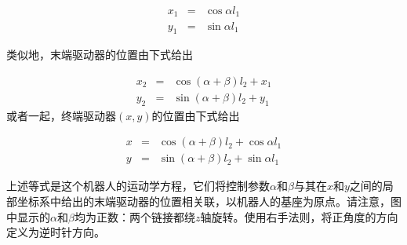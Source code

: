 \begin{eqnarray}\label{eq:cosxl1}
x_1 &=&\cos \alpha l_1\\
y_1 &=&\sin \alpha l_1
\end{eqnarray}

类似地，末端驱动器的位置由下式给出

\begin{eqnarray}
x_2&=&\cos(\alpha+\beta)l_2+x_1\\
y_2&=&\sin(\alpha+\beta)l_2+y_1
\end{eqnarray}
%
或者一起，终端驱动器$(x, y)$的位置由下式给出

\begin{eqnarray}\label{eq:cosx}
x&=&\cos(\alpha+\beta)l_2+\cos\alpha l_1\\
y&=&\sin(\alpha+\beta)l_2+\sin\alpha l_1
\end{eqnarray}


上述等式是这个机器人的运动学方程，它们将控制参数$\alpha$和$\beta$与其在$x$和$y$之间的局部坐标系中给出的末端驱动器的位置相关联，以机器人的基座为原点。请注意，图中显示的$\alpha$和$\beta$均为正数：两个链接都绕$z$轴旋转。使用右手法则，将正角度的方向定义为逆时针方向。


